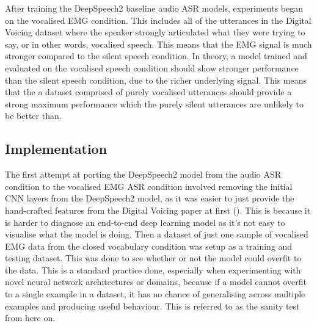 After training the DeepSpeech2 baseline audio ASR models, experiments
began on the vocalised EMG condition. This includes all of the utterances
in the Digital Voicing dataset where the speaker strongly articulated
what they were trying to say, or in other words, vocalised speech.
This means that the EMG signal is much stronger compared to the silent
speech condition. In theory, a model trained and evaluated on the vocalised
speech condition should show stronger performance than the silent speech
condition, due to the richer underlying signal. This means that the a dataset
comprised of purely vocalised utterances should provide a strong maximum
performance which the purely silent utterances are unlikely to be better
than.

\subsection{Implementation}

The first attempt at porting the DeepSpeech2 model from the audio ASR
condition to the vocalised EMG ASR condition involved removing the initial
CNN layers from the DeepSpeech2 model, as it was easier to just provide
the hand-crafted features from the Digital Voicing paper at first
(\cite{gaddy2020digital}). This is because it is harder to diagnose an
end-to-end deep learning model as it's not easy to visualise what the
model is doing. Then a dataset of just one sample of vocalised EMG
data from the closed vocabulary condition was setup as a training
and testing dataset. This was done to see whether or not the model
could overfit to the data. This is a standard practice done, especially
when experimenting with novel neural network architectures or domains,
because if a model cannot overfit to a single example in a dataset,
it has no chance of generalising across multiple examples and producing
useful behaviour. This is referred to as the sanity test from here on.

\fi